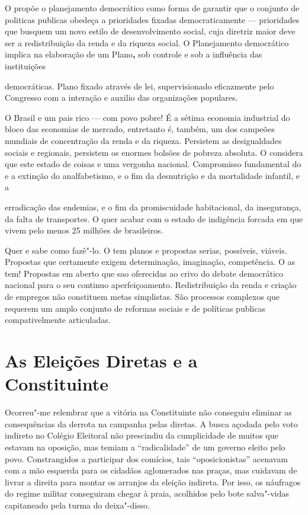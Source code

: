 O  propõe o planejamento democrático como forma de garantir que o
conjunto de politicas publicas obedeça a prioridades fixadas
democraticamente --- prioridades que busquem um novo estilo de
desenvolvimento social, cuja diretriz maior deve ser a redistribuição da
renda e da riqueza social. O Planejamento democrático implica na
elaboração de um Plano\textbf{,} sob controle e sob a influência das
instituições

democráticas. Plano fixado através de lei, supervisionado eficazmente
pelo Congresso com a interação e auxilio das organizações populares.

O Brasil e um pais rico --- com povo pobre! É a sétima economia
industrial do bloco das economias de mercado, entretanto é, também, um
dos campeões mundiais de concentração da renda e da riqueza. Persistem
as desigualdades sociais e regionais, persistem os enormes bolsões de
pobreza absoluta. O  considera que este estado de coisas e uma
vergonha nacional. Compromisso fundamental do  e a extinção do
analfabetismo, e o fim da desnutrição e da mortalidade infantil, e a

erradicação das endemias, e o fim da promiscuidade habitacional, da
insegurança, da falta de transportes. O  quer acabar com o estado de
indigência forcada em que vivem pelo menos 25 milhões de brasileiros.

Quer e sabe como fazê"-lo. O  tem planos e propostas serias,
possíveis, viáveis. Propostas que certamente exigem determinação,
imaginação, competência. O  as tem! Propostas em aberto que sao
oferecidas ao crivo do debate democrático nacional para o seu continuo
aperfeiçoamento. Redistribuição da renda e criação de empregos não
constituem metas simplistas. São processos complexos que requerem um
amplo conjunto de reformas sociais e de políticas publicas
compativelmente articuladas.

\section{As Eleições Diretas e a Constituinte}

Ocorreu"-me relembrar que a vitória na Constituinte não conseguiu
eliminar as consequências da derrota na campanha pelas diretas. A busca
açodada pelo voto indireto no Colégio Eleitoral não prescindiu da
cumplicidade de muitos que estavam na oposição, mas temiam a
``radicalidade'' de um governo eleito pelo povo. Constrangidos a
participar dos comícios, tais ``oposicionistas'' acenavam com a mão
esquerda para os cidadãos aglomerados nas praças, mas cuidavam de livrar
a direita para montar os arranjos da eleição indireta. Por isso, os
náufragos do regime militar conseguiram chegar à praia, acolhidos pelo
bote salva"-vidas capitaneado pela turma do deixa"-disso.

